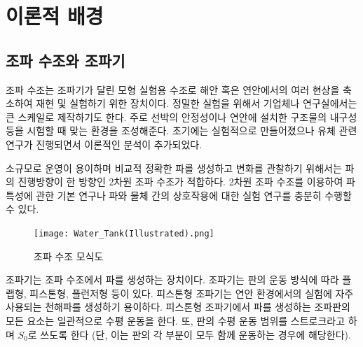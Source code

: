 \section{이론적 배경}

\subsection{조파 수조와 조파기}
조파 수조는 조파기가 달린 모형 실험용 수조로 해안 혹은 연안에서의 여러 현상을 축소하여 재현 및 실험하기 위한 장치이다. 정밀한 실험을 위해서 기업체나 연구실에서는 큰 스케일로 제작하기도 한다. 주로 선박의 안정성이나 연안에 설치한 구조물의 내구성 등을 시험할 때 맞는 환경을 조성해준다. 초기에는 실험적으로 만들어졌으나 유체 관련 연구가 진행되면서 이론적인 분석이 추가되었다. 

소규모로 운영이 용이하며 비교적 정확한 파를 생성하고 변화를 관찰하기 위해서는 파의 진행방향이 한 방향인 2차원 조파 수조가 적합하다. 2차원 조파 수조를 이용하여 파 특성에 관한 기본 연구나 파와 물체 간의 상호작용에 대한 실험 연구를 충분히 수행할 수 있다. 

\begin{figure}[htbp]
\begin{center}
\texttt{[image: Water\_Tank(Illustrated).png]}
\end{center}
\caption{조파 수조 모식도}
\label{Fig01}
\end{figure}
조파기는 조파 수조에서 파를 생성하는 장치이다. 조파기는 판의 운동 방식에 따라 플랩형, 피스톤형, 플런저형 등이 있다. 피스톤형 조파기는 연안 환경에서의 실험에 자주 사용되는 천해파를 생성하기 용이하다. 피스톤형 조파기에서 파를 생성하는 조파판의 모든 요소는 일관적으로 수평 운동을 한다. 또, 판의 수평 운동 범위를 스트로크라고 하며 $S_0$로 쓰도록 한다 (단, 이는 판의 각 부분이 모두 함께 운동하는 경우에 해당한다).

